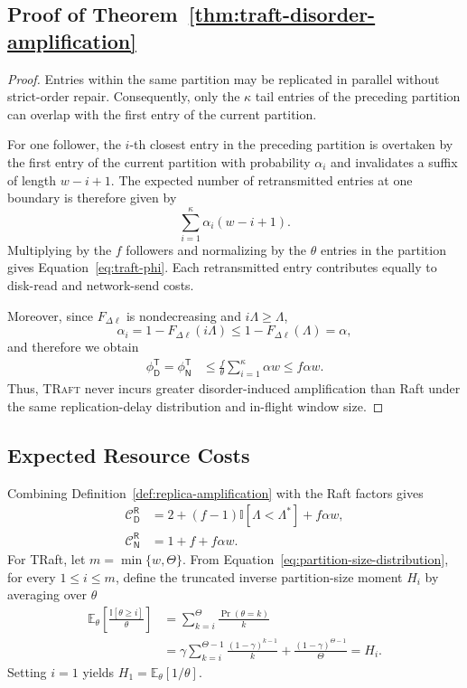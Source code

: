 \subsection{Proof of Theorem~\ref{thm:traft-disorder-amplification}}
\begin{proof}
Entries within the same partition may be replicated in parallel without
strict-order repair. Consequently, only the $\kappa$ tail entries of the
preceding partition can overlap with the first entry of the current partition.

For one follower, the $i$-th closest entry in the preceding partition is
overtaken by the first entry of the current partition with probability
$\alpha_i$ and invalidates a suffix of length $w-i+1$. The expected number of
retransmitted entries at one boundary is therefore given by
\[
\sum_{i=1}^{\kappa}\alpha_i(w-i+1).
\]
Multiplying by the $f$ followers and normalizing by the $\theta$ entries in the
partition gives Equation~\ref{eq:traft-phi}. Each retransmitted
entry contributes equally to disk-read and network-send costs.

Moreover, since $F_{\Delta\ell}$ is nondecreasing and
$i\Lambda\ge\Lambda$,
\[
\alpha_i
=
1-F_{\Delta\ell}(i\Lambda)
\le
1-F_{\Delta\ell}(\Lambda)
=\alpha,
\]
and therefore we obtain
\begin{align*}
\phi_{\mathsf{D}}^{\mathsf{T}}
=\phi_{\mathsf{N}}^{\mathsf{T}}
&\le \frac{f}{\theta}\sum_{i=1}^{\kappa}\alpha w
\le f\alpha w.
\end{align*}
Thus, \textsc{TRaft} never incurs greater disorder-induced amplification than Raft
under the same replication-delay distribution and in-flight window size.
\end{proof}

\subsection{Expected Resource Costs}
\label{subsec:expected-resource-cost}
Combining Definition~\ref{def:replica-amplification} with the Raft
factors gives
\begin{align}
\mathcal{C}_{\mathsf{D}}^{\mathsf{R}}
&=2+(f-1)\mathbb{I}[\Lambda<\Lambda^*]+f\alpha w,\nonumber\\
\mathcal{C}_{\mathsf{N}}^{\mathsf{R}}&=1+f+f\alpha w.
\label{eq:appendix-raft-cost}
\end{align}
For TRaft, let $m=\min\{w,\Theta\}$. From
Equation~\ref{eq:partition-size-distribution}, for every $1\leq i\leq m$,
define the truncated inverse partition-size moment $H_i$ by averaging over $\theta$
\begin{align*}
\mathbb{E}_{\theta}\!\left[
\frac{\mathbb{I}[\theta\geq i]}{\theta}
\right]
&=
\sum_{k=i}^{\Theta}\frac{\Pr(\theta=k)}{k}\\
&=
\gamma\sum_{k=i}^{\Theta-1}\frac{(1-\gamma)^{k-1}}{k}
+\frac{(1-\gamma)^{\Theta-1}}{\Theta}
=H_i.
\end{align*}
Setting $i=1$ yields
$H_1=\mathbb{E}_{\theta}[1/\theta]$.

